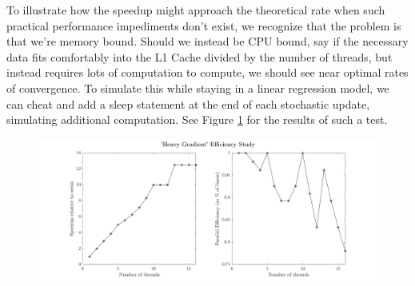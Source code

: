 To illustrate how the speedup might approach the theoretical rate when such
practical performance impediments don't exist, we recognize that the problem is
that we're memory bound. Should we instead be CPU bound, say if the necessary
data fits comfortably into the L1 Cache divided by the number of threads, but
instead requires lots of computation to compute, we should see near optimal
rates of convergence. To simulate this while staying in a linear regression
model, we can cheat and add a sleep statement at the end of each stochastic
update, simulating additional computation. See Figure \ref{fig:heavygrad} for
the results of such a test.
\begin{figure}[!htb]
  \centering
  \includegraphics[width=\textwidth]{./resources/heavy_gradient}
  \caption{
  } \label{fig:heavygrad}
\end{figure}
